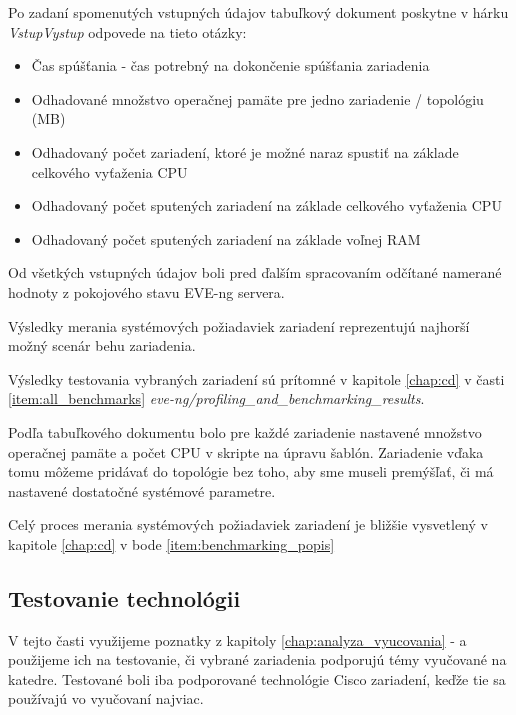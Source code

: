 Po zadaní spomenutých vstupných údajov tabuľkový dokument poskytne v hárku \emph{VstupVystup} odpovede na tieto otázky:

\begin{itemize}[noitemsep]
    \item Čas spúšťania - čas potrebný na dokončenie spúšťania zariadenia
    \item Odhadované množstvo operačnej pamäte pre jedno zariadenie / topológiu (MB)
    \item Odhadovaný počet zariadení, ktoré je možné naraz spustiť na základe celkového vyťaženia CPU
    \item Odhadovaný počet sputených zariadení na základe celkového vyťaženia CPU
    \item Odhadovaný počet sputených zariadení na základe voľnej RAM
\end{itemize}

Od všetkých vstupných údajov boli pred ďalším spracovaním odčítané namerané hodnoty z pokojového stavu EVE-ng servera.

Výsledky merania systémových požiadaviek zariadení reprezentujú najhorší možný scenár behu zariadenia.

Výsledky testovania vybraných zariadení sú prítomné v kapitole \ref{chap:cd} v časti \ref{item:all_benchmarks} \emph{eve-ng/profiling\_and\_benchmarking\_results}.

Podľa tabuľkového dokumentu bolo pre každé zariadenie nastavené množstvo operačnej pamäte a počet CPU v skripte na úpravu šablón. Zariadenie vďaka tomu môžeme pridávať do topológie bez toho, aby sme museli premýšľať, či má nastavené dostatočné systémové parametre.

Celý proces merania systémových požiadaviek zariadení je bližšie vysvetlený v kapitole \ref{chap:cd} v bode \ref{item:benchmarking_popis}





\subsection{Testovanie technológii}
\label{chap:testovanie_technologii}

V tejto časti využijeme poznatky z kapitoly \ref{chap:analyza_vyucovania} -  a použijeme ich na testovanie, či vybrané zariadenia podporujú témy vyučované na katedre. Testované boli iba podporované technológie Cisco zariadení, keďže tie sa používajú vo vyučovaní najviac.

